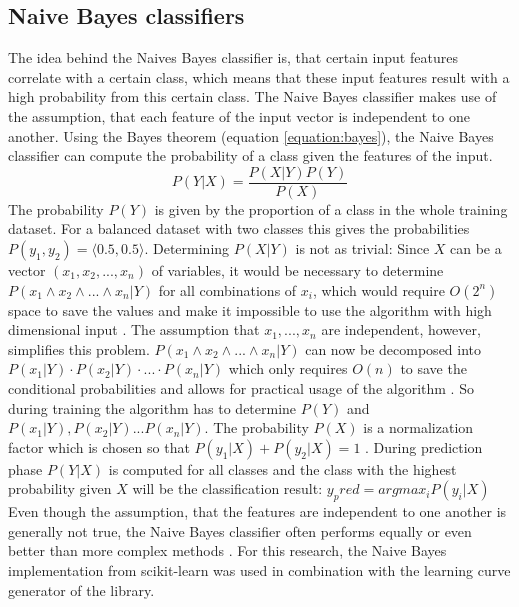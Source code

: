 \subsection{Naive Bayes classifiers}
The idea behind the Naives Bayes classifier is, that certain input features correlate with a certain class, which means that these input features result with a high probability from this certain class.
The Naive Bayes classifier makes use of the assumption, that each feature of the input vector is independent to one another.
Using the Bayes theorem (equation \ref{equation:bayes}), the Naive Bayes classifier can compute the probability of a class given the features of the input.
\begin{equation}
    P(Y|X) = \frac{P(X|Y)P(Y)}{P(X)}
    \label{equation:bayes}
\end{equation}
The probability $P(Y)$ is given by the proportion of a class in the whole training dataset.
For a balanced dataset with two classes this gives the probabilities $P(y_1, y_2)=\langle0.5,0.5\rangle$.
Determining $P(X|Y)$ is not as trivial:
Since $X$ can be a vector $(x_1, x_2, ..., x_n)$ of variables, it would be necessary to determine $P(x_1 \land x_2 \land ... \land x_n|Y)$ for all combinations of $x_i$, which would require $O(2^n)$ space to save the values and make it impossible to use the algorithm with high dimensional input \cite[p. 493]{Russel2016}.
The assumption that $x_1, ..., x_n$ are independent, however, simplifies this problem.
$P(x_1 \land x_2 \land ... \land x_n|Y)$ can now be decomposed into $P(x_1|Y)\cdot P(x_2|Y)\cdot...\cdot P(x_n|Y)$ which only requires $O(n)$ to save the conditional probabilities and allows for practical usage of the algorithm \cite[p. 499]{Russel2016}.
So during training the algorithm has to determine $P(Y)$ and $P(x_1|Y), P(x_2|Y) ... P(x_n|Y)$.
The probability $P(X)$ is a normalization factor which is chosen so that $P(y_1|X)+P(y_2|X)=1$ \cite[p. 493]{Russel2016}.
During prediction phase $P(Y|X)$ is computed for all classes and the class with the highest probability given $X$ will be the classification result: $y_pred = arg max_i P(y_i|X)$
Even though the assumption, that the features are independent to one another is generally not true, the Naive Bayes classifier often performs equally or even better than more complex methods \cite[p. 211]{Hastie2009}.
For this research, the Naive Bayes implementation from scikit-learn was used in combination with the learning curve generator of the library.

